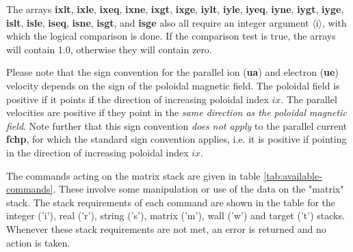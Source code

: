 \documentclass[a4paper,10pt]{report}
\begin{document}
The arrays
{\bf ixlt}, {\bf ixle}, {\bf ixeq}, {\bf ixne}, {\bf ixgt}, {\bf ixge},
{\bf iylt}, {\bf iyle}, {\bf iyeq}, {\bf iyne}, {\bf iygt}, {\bf iyge},
{\bf islt}, {\bf isle}, {\bf iseq}, {\bf isne}, {\bf isgt}, and {\bf isge}
also all require an integer argument $\langle$i$\rangle$,
with which the logical comparison is done. If the comparison test is true, the arrays
will contain 1.0, otherwise they will contain zero.

Please note that the sign convention for the parallel ion ({\bf ua}) and electron ({\bf ue}) velocity depends on the sign of the poloidal magnetic field. The poloidal field is positive if it points if the direction of increasing poloidal index $ix$. The parallel velocities are positive if they point in the {\em same direction as the poloidal magnetic field}. Note further that this sign convention {\em does not apply} to the parallel current {\bf fchp}, for which the standard sign convention applies, i.e. it is positive if pointing in the direction of increasing poloidal index $ix$.

The commands acting on the matrix stack are given in table
\ref{tab:available-commands}. These involve some manipulation or use of
the data on the "matrix" stack.  The stack requirements of each command
are shown in the table for the integer ('i'), real ('r'), string ('s'),
matrix ('m'), wall ('w') and target ('t') stacks. Whenever these stack requirements
are not met, an error is returned and no action is taken.
\end{document}
